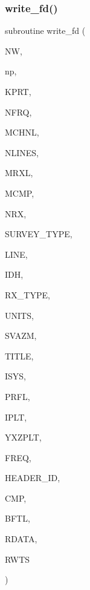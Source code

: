 \subsubsection{\texorpdfstring{write\+\_\+fd()}{write\_fd()}}
{\footnotesize\ttfamily subroutine write\+\_\+fd (\begin{DoxyParamCaption}\item[{integer}]{NW,  }\item[{integer}]{np,  }\item[{integer}]{K\+P\+RT,  }\item[{integer}]{N\+F\+RQ,  }\item[{integer}]{M\+C\+H\+NL,  }\item[{integer}]{N\+L\+I\+N\+ES,  }\item[{integer}]{M\+R\+XL,  }\item[{integer}]{M\+C\+MP,  }\item[{integer, dimension(nlines)}]{N\+RX,  }\item[{integer}]{S\+U\+R\+V\+E\+Y\+\_\+\+T\+Y\+PE,  }\item[{integer, dimension(nlines)}]{L\+I\+NE,  }\item[{integer, dimension(nlines)}]{I\+DH,  }\item[{integer, dimension(nlines)}]{R\+X\+\_\+\+T\+Y\+PE,  }\item[{integer, dimension(nlines)}]{U\+N\+I\+TS,  }\item[{real, dimension(nlines)}]{S\+V\+A\+ZM,  }\item[{character(len=120)}]{T\+I\+T\+LE,  }\item[{integer}]{I\+S\+YS,  }\item[{integer}]{P\+R\+FL,  }\item[{integer, dimension(nlines)}]{I\+P\+LT,  }\item[{real(kind=ql), dimension(3,mrxl,nlines)}]{Y\+X\+Z\+P\+LT,  }\item[{real, dimension(nfrq)}]{F\+R\+EQ,  }\item[{integer, dimension(nlines)}]{H\+E\+A\+D\+E\+R\+\_\+\+ID,  }\item[{integer, dimension(nlines)}]{C\+MP,  }\item[{real, dimension(mchnl,mrxl,mcmp,nlines)}]{B\+F\+TL,  }\item[{real, dimension(mchnl,mrxl,mcmp,nlines)}]{R\+D\+A\+TA,  }\item[{integer, dimension(mchnl,mrxl,mcmp,nlines)}]{R\+W\+TS }\end{DoxyParamCaption})}

